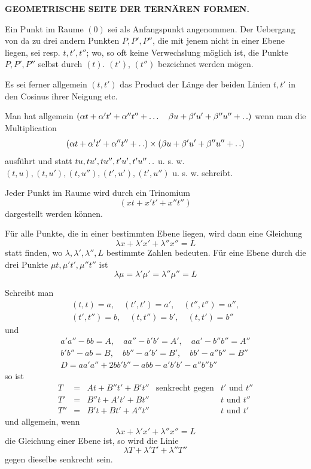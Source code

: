 \clearpage
\renewcommand{\BookRunningTitle}{Geometrische Seite der ternären Formen}
\begin{center}\Large\bfseries GEOMETRISCHE SEITE DER TERNÄREN FORMEN.\end{center}
\BookRule{30mm}

Ein Punkt im Raume $(0)$ sei als Anfangspunkt angenommen. Der Uebergang von da zu drei andern Punkten $P,P',P''$, die mit jenem nicht in einer Ebene liegen, sei resp. $t,t',t''$; wo, so oft keine Verwechslung möglich ist, die Punkte $P,P',P''$ selbst durch $(t)$. $(t')$, $(t'')$ bezeichnet werden mögen.

Es sei ferner allgemein $(t,t')$ das Product der Länge der beiden Linien $t,t'$ in den Cosinus ihrer Neigung etc.

Man hat allgemein $(\alpha t+\alpha't'+\alpha''t''+\ldots\quad\beta u+\beta'u'+\beta''u''+\mathinner{.\,.})$ wenn man die Multiplication
\[
(\alpha t+\alpha't'+\alpha''t''+\mathinner{.\,.})\times(\beta u+\beta'u'+\beta''u''+\mathinner{.\,.})
\]
ausführt und statt $tu,\allowbreak tu',\allowbreak tu'',\allowbreak t'u',\allowbreak t'u''\mathinner{.\,.}$ u. s. w. $(t,u),\allowbreak(t,u'),\allowbreak(t,u''),\allowbreak(t',u'),\allowbreak(t',u'')$ u. s. w. schreibt.

Jeder Punkt im Raume wird durch ein Trinomium
\[
(xt+x't'+x''t'')
\]
dargestellt werden können.

Für alle Punkte, die in einer bestimmten Ebene liegen, wird dann eine Gleichung
\[
\lambda x+\lambda'x'+\lambda''x''=L
\]
statt finden, wo $\lambda,\lambda',\lambda'',L$ bestimmte Zahlen bedeuten. Für eine Ebene durch die drei Punkte $\mu t,\mu't',\mu''t''$ ist
\[
\lambda\mu=\lambda'\mu'=\lambda''\mu''=L
\]

Schreibt man
\[
\begin{gathered}
(t,t)=a,\quad(t',t')=a',\quad(t'',t'')=a'',\\
(t',t'')=b,\quad(t,t'')=b',\quad(t,t')=b''
\end{gathered}
\]
und
\[
\begin{gathered}
a'a''-bb=A,\quad aa''-b'b'=A',\quad aa'-b''b''=A''\\
b'b''-ab=B,\quad bb''-a'b'=B',\quad bb'-a''b''=B''\\
D=aa'a''+2bb'b''-abb-a'b'b'-a''b''b''
\end{gathered}
\]
so ist
\[
\begin{array}{rclll}
T&=&At+B''t'+B't''&\text{senkrecht gegen}&t'\text{ und }t''\\
T'&=&B''t+A't'+Bt''&&t\text{ und }t''\\
T''&=&B't+Bt'+A''t''&&t\text{ und }t'
\end{array}
\]
und allgemein, wenn
\[
\lambda x+\lambda'x'+\lambda''x''=L
\]
die Gleichung einer Ebene ist, so wird die Linie
\[
\lambda T+\lambda'T'+\lambda''T''
\]
gegen dieselbe senkrecht sein.

